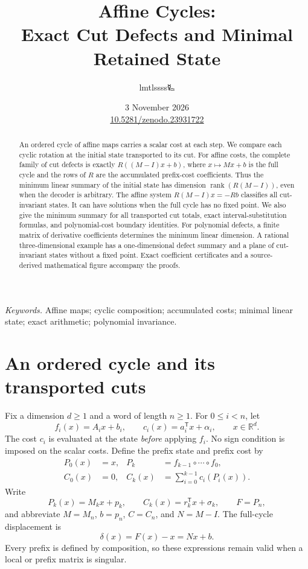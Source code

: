 \documentclass[11pt,a4paper]{article}
\title{\LARGE Affine Cycles:\\Exact Cut Defects and Minimal Retained State}
\author{lmtlssss{\authorsymbol 🜐}}
\date{3 November 2026\\[3pt]\small\href{https://doi.org/10.5281/zenodo.23931722}{10.5281/zenodo.23931722}}
\theoremstyle{definition}\newtheorem{definition}[theorem]{Definition}\newtheorem{example}[theorem]{Example}\newtheorem{remark}[theorem]{Remark}
\DeclareMathOperator{\rank}{rank}\DeclareMathOperator{\im}{im}\DeclareMathOperator{\spanop}{span}\DeclareMathOperator{\diag}{diag}
\newcommand{\R}{\mathbb R}\newcommand{\Q}{\mathbb Q}\newcommand{\Z}{\mathbb Z}\newcommand{\N}{\mathbb N}\newcommand{\id}{\mathrm{id}}
\begin{document}
\maketitle\thispagestyle{plain}

\begin{abstract}
An ordered cycle of affine maps carries a scalar cost at each step. We
compare each cyclic rotation at the initial state transported to its cut.
For affine costs, the complete family of cut defects is exactly
$R((M-I)x+b)$, where $x\mapsto Mx+b$ is the full cycle and the rows of
$R$ are the accumulated prefix-cost coefficients. Thus the minimum
linear summary of the initial state has dimension $\rank(R(M-I))$,
even when the decoder is arbitrary. The affine system
$R(M-I)x=-Rb$ classifies all cut-invariant states. It can have solutions
when the full cycle has no fixed point. We also give the minimum summary
for all transported cut totals, exact interval-substitution formulas,
and polynomial-cost boundary identities. For polynomial defects,
a finite matrix of derivative coefficients determines the minimum
linear dimension. A rational three-dimensional example has a
one-dimensional defect summary and a plane of cut-invariant states
without a fixed point. Exact coefficient certificates and a
source-derived mathematical figure accompany the proofs.
\end{abstract}
\noindent\textit{Keywords.} Affine maps; cyclic composition; accumulated
costs; minimal linear state; exact arithmetic; polynomial invariance.

\section{An ordered cycle and its transported cuts}
Fix a dimension $d\ge1$ and a word of length $n\ge1$. For
$0\le i<n$, let
\[
 f_i(x)=A_i x+b_i,\qquad c_i(x)=a_i^{\mathsf T}x+\alpha_i,
 \qquad x\in\R^d.
\]
The cost $c_i$ is evaluated at the state \emph{before} applying $f_i$.
No sign condition is imposed on the scalar costs. Define the prefix
state and prefix cost by
\begin{equation}\label{eq:prefix}
 \begin{aligned}
 P_0(x)&=x,&P_k&=f_{k-1}\circ\cdots\circ f_0,\\
 C_0(x)&=0,&C_k(x)&=\sum_{i=0}^{k-1}c_i(P_i(x)).
 \end{aligned}
\end{equation}
Write
\[
 P_k(x)=M_kx+p_k,\qquad C_k(x)=r_k^{\mathsf T}x+\sigma_k,
 \qquad F=P_n,
\]
and abbreviate $M=M_n$, $b=p_n$, $C=C_n$, and
$N=M-I$. The full-cycle displacement is
\begin{equation}\label{eq:displacement}
 \delta(x)=F(x)-x=Nx+b.
\end{equation}
Every prefix is defined by composition, so these expressions remain
valid when a local or prefix matrix is singular.
\end{document}
